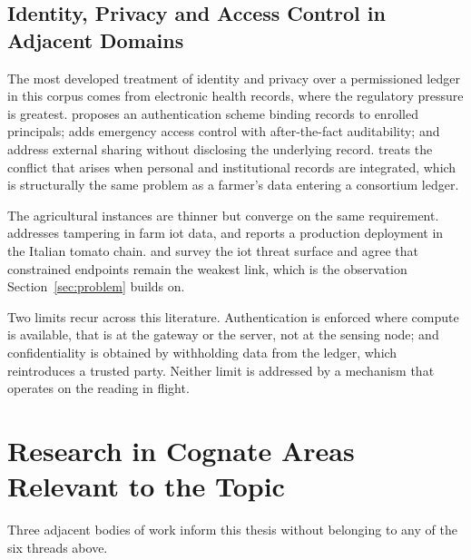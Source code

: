 \documentclass[12pt,a4paper,oneside]{book}
\begin{document}
\subsection{Identity, Privacy and Access Control in Adjacent Domains}
\label{subsec:lit_privacy_extended}

The most developed treatment of identity and privacy over a permissioned ledger
in this corpus comes from electronic health records, where the regulatory
pressure is greatest. \textcite{tang2019efficientauthentication} proposes an
authentication scheme binding records to enrolled principals;
\textcite{rajput2019eacmsemergency} adds emergency access control with
after-the-fact auditability; \textcite{yousif2026enablingprivacy} and
\textcite{hurdson2026enhancingelectronic} address external sharing without
disclosing the underlying record. \textcite{kormiltsyn2023privacyconflict}
treats the conflict that arises when personal and institutional records are
integrated, which is structurally the same problem as a farmer's data entering
a consortium ledger.

The agricultural instances are thinner but converge on the same requirement.
\textcite{ali2023farmDataTampering} addresses tampering in farm \gls{iot} data,
and \textcite{safeer2024tomato} reports a production deployment in the Italian
tomato chain. \textcite{aouedi2024surveyintelligent} and
\textcite{sahu2024exploringsecurity} survey the \gls{iot} threat surface and
agree that constrained endpoints remain the weakest link, which is the
observation Section~\ref{sec:problem} builds on.

Two limits recur across this literature. Authentication is enforced where
compute is available, that is at the gateway or the server, not at the sensing
node; and confidentiality is obtained by withholding data from the ledger,
which reintroduces a trusted party. Neither limit is addressed by a mechanism
that operates on the reading in flight.

\section{Research in Cognate Areas Relevant to the Topic}
\label{sec:lit_cognate}

Three adjacent bodies of work inform this thesis without belonging to any
of the six threads above.
\end{document}
